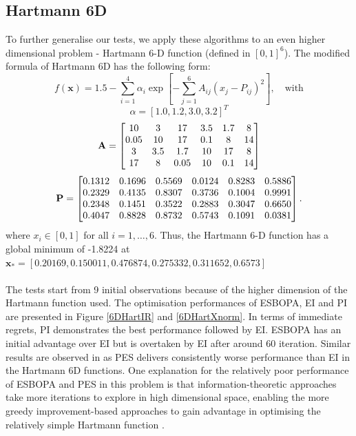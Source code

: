 \documentclass[a4paper,11pt]{report}
\begin{document}
\subsection{Hartmann 6D}
To further generalise our tests, we apply these algorithms to an even higher dimensional problem - Hartmann 6-D function (defined in $[0,1] ^6 $). The modified formula of Hartmann 6D has the following form: 
\begin{equation}
f(\mathbf{x}) = 1.5 - \sum_{i=1}^{4} \alpha_i \exp \left [ - \sum_{j=1}^6 A_{ij} ( x_j - P_{ij}) ^2 \right] , \hspace{12pt}\text{with}
\end{equation}
\[ \alpha = [ 1.0, 1.2, 3.0, 3.2 ] ^T\] 
\[ \bold{A} = \begin{bmatrix} 
	10    &	3	&	17	&	3.5	&	1.7	&	8	\\
    	0.05 &	10 	&	17	& 	0.1	&	8	&	14	\\
	3	&	3.5	&	1.7	&	10	&	17	&	8	\\
	17	&	8	&	0.05	&	10	&	0.1	&	14
\end{bmatrix}
\]
\[ \bold{P} = \begin{bmatrix} 
	0.1312	&	0.1696	&	0.5569	&	0.0124	&	0.8283	&	0.5886\\
         0.2329	&	0.4135	&	 0.8307	&	0.3736	&	0.1004	&	0.9991\\
         0.2348	&	0.1451	&	0.3522	&	0.2883	&	0.3047	&	0.6650\\
         0.4047	&	0.8828	&	0.8732	&	0.5743	&	0.1091	&	0.0381\\
\end{bmatrix}.
\]
where $x_i \in [0,1]$ for all $i=1, \dots , 6$. Thus, the Hartmann 6-D function has a global minimum of -1.8224 at $\mathbf{x}_* = [0.20169, 0.150011, 0.476874, 0.275332, 0.311652, 0.6573]$
\\\\
The tests start from 9 initial observations because of the higher dimension of the Hartmann function used. The optimisation performances of ESBOPA, EI and PI are presented in Figure \ref{6DHartIR} and \ref{6DHartXnorm}. In terms of immediate regrets, PI demonstrates the best performance followed by EI. ESBOPA has an initial advantage over EI but is overtaken by EI after around 60 iteration. 
Similar results are observed in \cite{hernandez2014predictive} as PES delivers consistently worse performance than EI in the Hartmann 6D functions. One explanation for the relatively poor performance of ESBOPA and PES in this problem is that information-theoretic approaches take more iterations to explore in high dimensional space, enabling the more greedy improvement-based approaches to gain advantage in optimising the relatively simple Hartmann function \cite{hernandez2014predictive}. 
\end{document}
